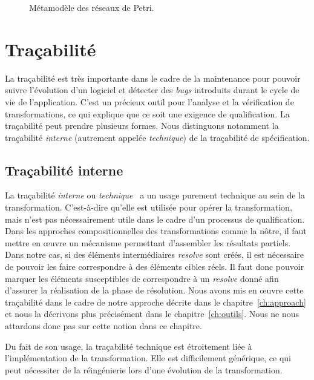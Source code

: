 \begin{figure}[h]%
  \begin{center}
    
    \caption{Métamodèle des réseaux de Petri.}
    \label{fig:petrinetmmodel2}
  \end{center}
\end{figure}

\FloatBarrier

\section{Traçabilité}

La traçabilité est très importante dans le cadre de la maintenance pour pouvoir
suivre l'évolution d'un logiciel et détecter des \emph{bugs} introduits durant
le cycle de vie de l'application. C'est un précieux outil pour l'analyse et
la vérification de transformations, ce qui explique que ce soit une exigence de
qualification. La traçabilité peut prendre plusieurs formes. Nous distinguons
notamment la traçabilité \emph{interne} (autrement appelée \emph{technique}) de
la traçabilité de spécification.

\subsection{Traçabilité interne}

La traçabilité \emph{interne} ou \emph{technique}~\cite{Jouault2005} a un usage
purement technique au sein de la transformation. C'est-à-dire qu'elle est
utilisée pour opérer la transformation, mais n'est pas nécessairement utile dans
le cadre d'un processus de qualification. Dans les approches compositionnelles
des transformations comme la nôtre, il faut mettre en œuvre un mécanisme
permettant d'assembler les résultats partiels. Dans notre cas, si des éléments
intermédiaires \emph{resolve} sont créés, il est nécessaire de pouvoir les
faire correspondre à des éléments cibles réels. Il faut donc pouvoir marquer
les éléments susceptibles de correspondre à un \emph{resolve} donné afin
d'assurer la réalisation de la phase de résolution. Nous avons mis en œuvre
cette traçabilité dans le cadre de notre approche décrite dans le
chapitre~\ref{ch:approach} et nous la décrivons plus précisément dans le
chapitre~\ref{ch:outils}. Nous ne nous attardons donc pas sur cette notion dans
ce chapitre.

Du fait de son usage, la traçabilité technique est étroitement liée à
l'implémentation de la transformation. Elle est difficilement générique, ce qui
peut nécessiter de la réingénierie lors d'une évolution de la transformation.

